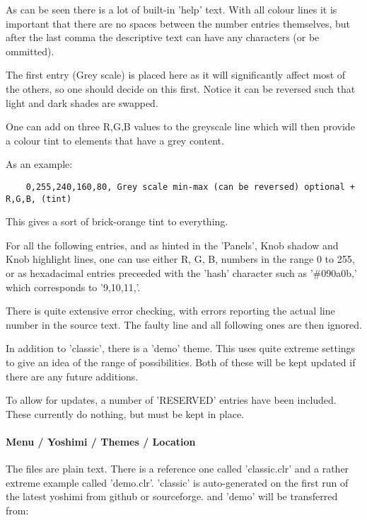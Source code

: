    As can be seen there is a lot of built-in 'help' text.
   With all colour lines it is important that there are no spaces between the
   number entries themselves, but after the last comma the descriptive text can
   have any characters (or be ommitted).

   The first entry (Grey scale) is placed here as it will significantly affect
   most of the others, so one should decide on this first. Notice it can be
   reversed such that light and dark shades are swapped.

   One can add on three R,G,B values to the greyscale line which will then provide a colour
   tint to elements that have a grey content.

   As an example:

   \begin{verbatim}
    0,255,240,160,80, Grey scale min-max (can be reversed) optional + R,G,B, (tint)
   \end{verbatim}

   This gives a sort of brick-orange tint to everything.

   For all the following entries, and as hinted in the 'Panels', Knob shadow
   and Knob highlight lines, one can use either R, G, B, numbers in the range
   0 to 255, or as hexadacimal entries preceeded with the 'hash' character such
   as '\#090a0b,' which corresponds to '9,10,11,'.

   There is quite extensive error checking, with errors reporting the actual
   line number in the source text. The faulty line and all following ones are
   then ignored.

   In addition to 'classic', there is a 'demo' theme. This uses quite extreme
   settings to give an idea of the range of possibilities. Both of these will be
   kept updated if there are any future additions.

   To allow for updates, a number of 'RESERVED' entries have been included. These
   currently do nothing, but must be kept in place.

\paragraph{Menu / Yoshimi / Themes / Location}
\label{paragraph:menu_yoshimi_themes_location}

   The files are plain text. There is a reference one called 'classic.clr' and a
   rather extreme example called 'demo.clr'.
   'classic' is auto-generated on the first run of the latest yoshimi from github
   or sourceforge. and 'demo' will be transferred from:


